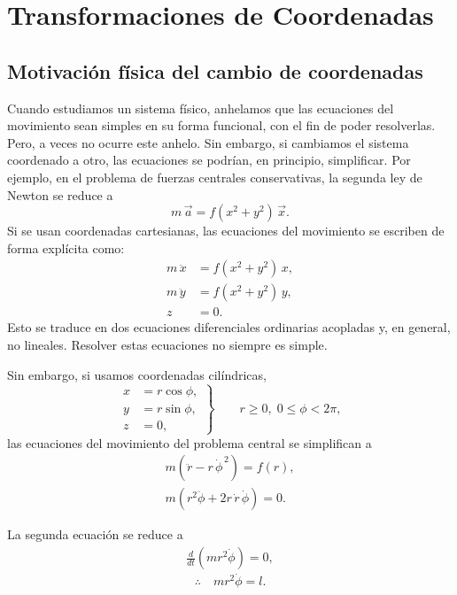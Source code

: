 \documentclass[../apunte_mecanica_clasica.tex]{subfiles}%
\begin{document}
\chapter{Transformaciones de Coordenadas}


\section{Motivación física del cambio de coordenadas}

Cuando estudiamos un sistema físico, anhelamos que las ecuaciones del movimiento sean simples en su forma funcional, con el fin de poder resolverlas.
Pero, a veces no ocurre este anhelo.
Sin embargo, si cambiamos el sistema coordenado a otro, las ecuaciones se podrían, en principio, simplificar.
Por ejemplo, en el problema de fuerzas centrales conservativas, la segunda ley de Newton se reduce a
\begin{equation*}
m\,\vec{a} = f(x^2+y^2)\,\vec{x}.
\end{equation*}
Si se usan coordenadas cartesianas, las ecuaciones del movimiento se escriben de forma explícita como:
\begin{align*}
m\,\ddot{x} &= f(x^2+y^2)\,x, \\[4pt]
m\,\ddot{y} &= f(x^2+y^2)\,y, \\[4pt]
z &= 0.
\end{align*}
Esto se traduce en dos ecuaciones diferenciales ordinarias acopladas y, en general, no lineales. Resolver estas ecuaciones no siempre es simple.

Sin embargo, si usamos coordenadas cilíndricas, 
\begin{equation*} 
\left.\begin{aligned}
x &= r\cos\phi, \\
y &= r\sin\phi, \\
z &= 0, 
\end{aligned} \right\} \qquad r \ge 0,\; 0 \le \phi < 2\pi,
\end{equation*}
las ecuaciones del movimiento del problema central se simplifican a
\begin{align*}
m\!\left(\ddot r - r\,\dot\phi^{\,2}\right) = f(r), \\[4pt]
m\!\left(r^{2}\ddot\phi + 2r\,\dot r\,\dot\phi\right) = 0.
\end{align*}

La segunda ecuación se reduce a
\begin{align*}
\frac{d}{dt}\!\left(m r^{2}\dot\phi\right)=0,
\end{align*}
\begin{equation*}
    \therefore\quad m r^{2}\dot\phi = l.
\end{equation*}
\end{document}

